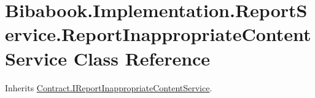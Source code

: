 \hypertarget{class_bibabook_1_1_implementation_1_1_report_service_1_1_report_inappropriate_content_service}{}\section{Bibabook.\+Implementation.\+Report\+Service.\+Report\+Inappropriate\+Content\+Service Class Reference}
\label{class_bibabook_1_1_implementation_1_1_report_service_1_1_report_inappropriate_content_service}


Inherits \hyperlink{interface_contract_1_1_i_report_inappropriate_content_service}{Contract.\+I\+Report\+Inappropriate\+Content\+Service}.

